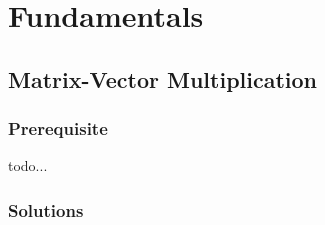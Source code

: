 
\part{Fundamentals}

\chapter{Matrix-Vector Multiplication}

\section{Prerequisite}
todo...

\section{Solutions}
